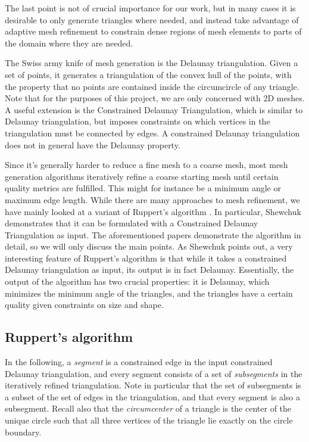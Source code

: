 \documentclass[10pt,a4paper]{article}
\begin{document}
The last point is not of crucial importance for our work, but in many cases it is desirable to only generate triangles where needed, and instead take advantage of adaptive mesh refinement to constrain dense regions of mesh elements to parts of the domain where they are needed.

The Swiss army knife of mesh generation is the Delaunay triangulation. Given a set of points, it generates a triangulation of the convex hull of the points, with the property that no points are contained inside the circumcircle of any triangle. Note that for the purposes of this project, we are only concerned with 2D meshes. A useful extension is the Constrained Delaunay Triangulation, which is similar to Delaunay triangulation, but imposes constraints on which vertices in the triangulation must be connected by edges. A constrained Delaunay triangulation does not in general have the Delaunay property.

Since it's generally harder to reduce a fine mesh to a coarse mesh, most mesh generation algorithms iteratively refine a coarse starting mesh until certain quality metrics are fulfilled. This might for instance be a minimum angle or maximum edge length. While there are many approaches to mesh refinement, we have mainly looked at a variant of Ruppert's algorithm \cite{ruppert}. In particular, Shewchuk \cite{shewchuk} demonstrates that it can be formulated with a Constrained Delaunay Triangulation as input. The aforementioned papers demonstrate the algorithm in detail, so we will only discuss the main points. As Shewchuk points out, a very interesting feature of Ruppert's algorithm is that while it takes a constrained Delaunay triangulation as input, its output is in fact Delaunay. Essentially, the output of the algorithm has two crucial properties: it is Delaunay, which minimizes the minimum angle of the triangles, and the triangles have a certain quality given constraints on size and shape.

\subsection*{Ruppert's algorithm}
In the following, a \emph{segment} is a constrained edge in the input constrained Delaunay triangulation, and every segment consists of a set of \emph{subsegments} in the iteratively refined triangulation. Note in particular that the set of subsegments is a subset of the set of edges in the triangulation, and that every segment is also a subsegment. Recall also that the \emph{circumcenter} of a triangle is the center of the unique circle such that all three vertices of the triangle lie exactly on the circle boundary.
\end{document}
